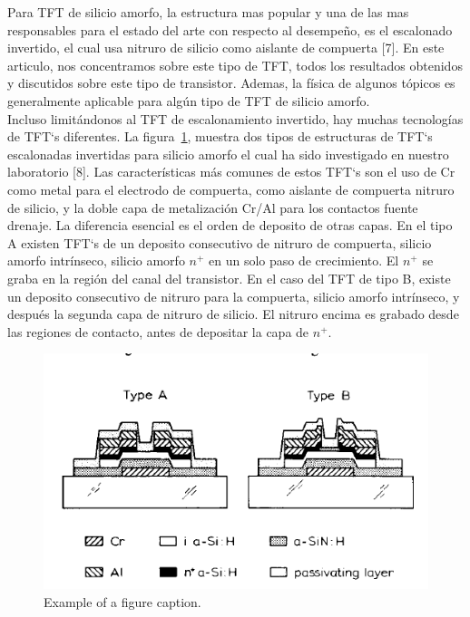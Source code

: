 \documentclass[conference]{IEEEtran}
\begin{document}
    Para TFT de silicio amorfo, la estructura mas popular y una de las mas responsables
    para el estado del arte con respecto al desempeño, es el escalonado invertido, el
    cual usa nitruro de silicio como aislante de compuerta [7]. En este articulo, nos
    concentramos sobre este tipo de TFT, todos los resultados obtenidos y discutidos
    sobre este tipo de transistor. Ademas, la física de algunos tópicos es generalmente
    aplicable para algún tipo de TFT de silicio amorfo.
    \\
    Incluso limitándonos al TFT de escalonamiento invertido, hay muchas tecnologías 
    de TFT`s diferentes. La figura~\ref{fig2}, muestra dos tipos de estructuras de TFT`s
    escalonadas invertidas para silicio amorfo el cual ha sido investigado en nuestro
    laboratorio [8]. Las características más comunes de estos TFT`s son el uso de Cr como
    metal para el electrodo de compuerta, como aislante de compuerta nitruro de
    silicio, y la doble capa de metalización Cr/Al para los contactos fuente drenaje.
    La diferencia esencial es el orden de deposito de otras capas. En el tipo A
    existen TFT`s de un deposito consecutivo de nitruro de compuerta, silicio amorfo
    intrínseco, silicio amorfo $n^+$ en un solo paso de crecimiento. El $n^+$ se graba en
    la región del canal del transistor. En el caso del TFT de tipo B, existe un deposito
    consecutivo de nitruro para la compuerta, silicio amorfo intrínseco, y después
    la segunda capa de nitruro de silicio. El nitruro encima es grabado desde las
    regiones de contacto, antes de depositar la capa de $n^+$.

\begin{figure}[htbp]
    \centerline{\includegraphics{img/imagen-2.png}}
    \caption{Example of a figure caption.}%
    \label{fig2}
\end{figure}
\end{document}
